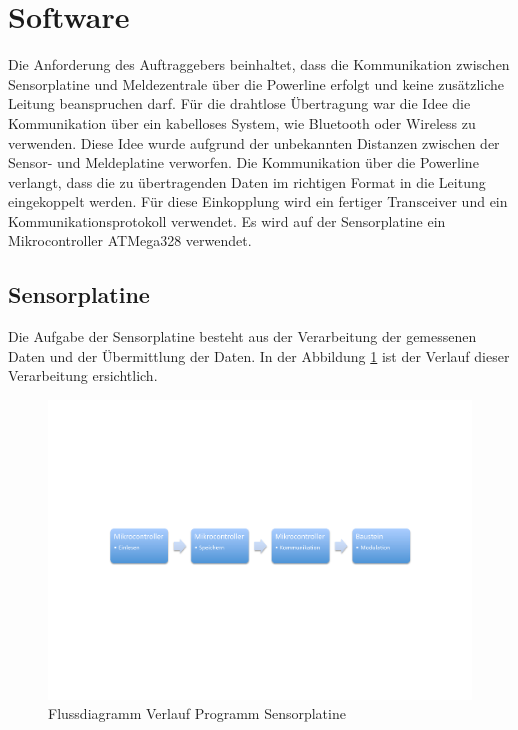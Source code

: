 %
%
%

\section{Software}
Die Anforderung des Auftraggebers beinhaltet, dass die Kommunikation zwischen Sensorplatine und Meldezentrale über die Powerline erfolgt und keine zusätzliche Leitung beanspruchen darf. Für die drahtlose Übertragung war die Idee die Kommunikation über ein kabelloses System, wie Bluetooth oder Wireless zu verwenden. Diese Idee wurde aufgrund der unbekannten Distanzen zwischen der Sensor- und Meldeplatine verworfen. Die Kommunikation über die Powerline verlangt, dass die zu übertragenden Daten im richtigen Format in die Leitung eingekoppelt werden. Für diese Einkopplung wird ein fertiger Transceiver und ein Kommunikationsprotokoll verwendet. Es wird auf der Sensorplatine ein Mikrocontroller ATMega328 verwendet.


\subsection{Sensorplatine}
Die Aufgabe der Sensorplatine besteht aus der Verarbeitung der gemessenen Daten und der Übermittlung der Daten. In der Abbildung \ref{fig:Software_Flussdiagramm_Sensorplatine} ist der Verlauf dieser Verarbeitung ersichtlich.

\begin{figure}[htbp] 
  \centering
     \includegraphics[width=1\textwidth]{graphics/Software_Flussdiagramm_Sensorplatine}
  \caption{Flussdiagramm Verlauf Programm Sensorplatine}
  \label{fig:Software_Flussdiagramm_Sensorplatine}
\end{figure}

